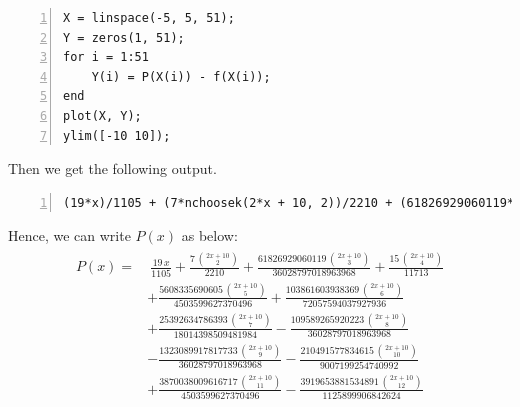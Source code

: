 \documentclass{article}
\begin{document}
\begin{enumerate}
\begin{lstlisting}[frame=single, numbers=left, style=Matlab-editor]
% Plot P(x)-f(x)
X = linspace(-5, 5, 51);
Y = zeros(1, 51);
for i = 1:51
    Y(i) = P(X(i)) - f(X(i));
end
plot(X, Y);
ylim([-10 10]);
    \end{lstlisting}
    Then we get the following output.
    \begin{lstlisting}[frame=single, numbers=left, style=Matlab-editor]
(19*x)/1105 + (7*nchoosek(2*x + 10, 2))/2210 + (61826929060119*nchoosek(2*x + 10, 3))/36028797018963968 + (15*nchoosek(2*x + 10, 4))/11713 + (5608335690605*nchoosek(2*x + 10, 5))/4503599627370496 + (103861603938369*nchoosek(2*x + 10, 6))/72057594037927936 + (25392634786393*nchoosek(2*x + 10, 7))/18014398509481984 - (109589265920223*nchoosek(2*x + 10, 8))/36028797018963968 - (1323089917817733*nchoosek(2*x + 10, 9))/36028797018963968 - (210491577834615*nchoosek(2*x + 10, 10))/9007199254740992 + (3870038009616717*nchoosek(2*x + 10, 11))/4503599627370496 - (3919653881534891*nchoosek(2*x + 10, 12))/1125899906842624 + (7988155378824295*nchoosek(2*x + 10, 13))/1125899906842624 - (3473111034271553*nchoosek(2*x + 10, 14))/1125899906842624 - (5209666551407073*nchoosek(2*x + 10, 15))/140737488355328 + (6381841525473693*nchoosek(2*x + 10, 16))/35184372088832 - (2490871819891521*nchoosek(2*x + 10, 17))/4398046511104 + (196888765175249*nchoosek(2*x + 10, 18))/137438953472 - (6959788908520431*nchoosek(2*x + 10, 19))/2199023255552 + (6959788908520431*nchoosek(2*x + 10, 20))/1099511627776 + 55/442
    \end{lstlisting}
    Hence, we can write $P(x)$ as below:
    \begin{align} \label{eq1}
        \begin{split}
            P(x) =
            & \ \frac{19\,x}{1105}
            +\frac{7\,\binom{2x+10}{2}}{2210}
            +\frac{61826929060119\,\binom{2x+10}{3}}{36028797018963968}
            +\frac{15\,\binom{2x+10}{4}}{11713}
            \\ & +\frac{5608335690605\,\binom{2x+10}{5}}{4503599627370496}
            +\frac{103861603938369\,\binom{2x+10}{6}}{72057594037927936} 
            \\ & +\frac{25392634786393\,\binom{2x+10}{7}}{18014398509481984}
            -\frac{109589265920223\,\binom{2x+10}{8}}{36028797018963968} 
            \\ & -\frac{1323089917817733\,\binom{2x+10}{9}}{36028797018963968}
            -\frac{210491577834615\,\binom{2x+10}{10}}{9007199254740992} 
            \\ & +\frac{3870038009616717\,\binom{2x+10}{11}}{4503599627370496}
            -\frac{3919653881534891\,\binom{2x+10}{12}}{1125899906842624} 

\end{split}
\end{align}
\end{enumerate}
\end{document}
